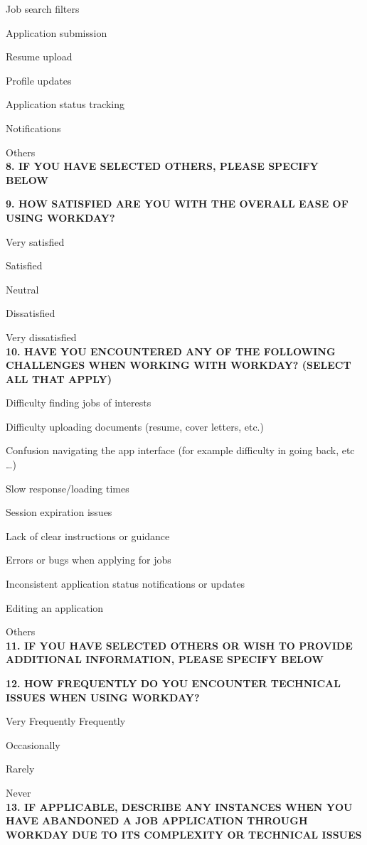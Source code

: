 \documentclass[
	letterpaper, %
]{jdf}
\begin{document}
Job search filters

Application submission

Resume upload

Profile updates

Application status tracking

Notifications

Others \\

\textbf{8. IF YOU HAVE SELECTED OTHERS, PLEASE SPECIFY BELOW
}

\textbf{9. HOW SATISFIED ARE YOU WITH THE OVERALL EASE OF USING WORKDAY?}

Very satisfied

Satisfied

Neutral

Dissatisfied

Very dissatisfied \\

\textbf{10. HAVE YOU ENCOUNTERED ANY OF THE FOLLOWING CHALLENGES WHEN WORKING WITH WORKDAY? (SELECT ALL THAT APPLY)
}

Difficulty finding jobs of interests

Difficulty uploading documents (resume, cover letters, etc.)

Confusion navigating the app interface (for example difficulty in going back, etc …)

Slow response/loading times

Session expiration issues

Lack of clear instructions or guidance

Errors or bugs when applying for jobs

Inconsistent application status notifications or updates

Editing an application

Others \\

\textbf{11. IF YOU HAVE SELECTED OTHERS OR WISH TO PROVIDE ADDITIONAL INFORMATION, PLEASE SPECIFY BELOW} 

\textbf{12. HOW FREQUENTLY DO YOU ENCOUNTER TECHNICAL ISSUES WHEN USING WORKDAY? 
}

Very Frequently
Frequently

Occasionally

Rarely

Never \\

\textbf{13. IF APPLICABLE, DESCRIBE ANY INSTANCES WHEN YOU HAVE ABANDONED A JOB APPLICATION THROUGH WORKDAY DUE TO ITS COMPLEXITY OR TECHNICAL ISSUES 
}
\end{document}
